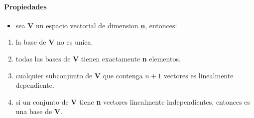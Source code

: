\documentclass[a4paper]{article}
\begin{document}
\paragraph{Propiedades}
\begin{itemize}
	\item sea \textbf{V} un espacio vectorial de dimension \textbf{n}, entonces: 
\end{itemize}
\begin{enumerate}
	\item la base de \textbf{V} no es unica.
	\item todas las bases de \textbf{V} tienen exactamente \textbf{n} elementos.
	\item cualquier subconjunto de \textbf{V} que contenga $n+1$ vectores es linealmente dependiente.
	\item si un conjunto de \textbf{V} tiene \textbf{n} vectores linealmente independientes, entonces es una base de \textbf{V}.
\end{enumerate}
\end{document}
